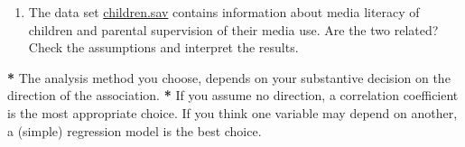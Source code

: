 \documentclass[a4paper]{book}
\newenvironment{Shaded}{\begin{snugshade}}{\end{snugshade}}
\newcommand{\StringTok}[1]{\textcolor[rgb]{0.00,0.00,0.00}{#1}}
\newcommand{\OperatorTok}[1]{\textcolor[rgb]{0.00,0.00,0.00}{\textbf{#1}}}
\newcommand{\NormalTok}[1]{#1}
\providecommand{\tightlist}{%
  \setlength{\itemsep}{0pt}\setlength{\parskip}{0pt}}
\theoremstyle{definition}
\theoremstyle{definition}
\theoremstyle{definition}
\theoremstyle{remark}
\begin{document}
\begin{enumerate}
\def\labelenumi{\arabic{enumi}.}
\setcounter{enumi}{2}
\tightlist
\item
  The data set
  \href{http://82.196.4.233:3838/data/children.sav}{children.sav}
  contains information about media literacy of children and parental
  supervision of their media use. Are the two related? Check the
  assumptions and interpret the results.
\end{enumerate}

\begin{Shaded}
\begin{Highlighting}[]
\OperatorTok{*}\StringTok{ }\NormalTok{The analysis method you choose, depends on your substantive decision on the}
\NormalTok{direction of the association.}
\OperatorTok{*}\StringTok{ }\NormalTok{If you assume no direction, a correlation coefficient is the most}
\NormalTok{appropriate choice. If you think one variable may depend on another, a}
\NormalTok{(simple) regression model is the best choice.}
  

\end{Highlighting}
\end{Shaded}
\end{document}
